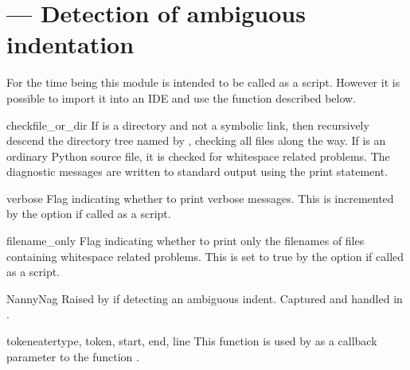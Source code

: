 \section{ ---
         Detection of ambiguous indentation}



For the time being this module is intended to be called as a script.
However it is possible to import it into an IDE and use the function
 described below.


\begin{funcdesc}{check}{file_or_dir}
  If  is a directory and not a symbolic link, then
  recursively descend the directory tree named by ,
  checking all  files along the way.  If 
  is an ordinary Python source file, it is checked for whitespace
  related problems.  The diagnostic messages are written to standard
  output using the print statement.
\end{funcdesc}


\begin{datadesc}{verbose}
  Flag indicating whether to print verbose messages.
  This is incremented by the  option if called as a script.
\end{datadesc}


\begin{datadesc}{filename_only}
  Flag indicating whether to print only the filenames of files
  containing whitespace related problems.  This is set to true by the
   option if called as a script.
\end{datadesc}


\begin{excdesc}{NannyNag}
  Raised by  if detecting an ambiguous indent.
  Captured and handled in .
\end{excdesc}


\begin{funcdesc}{tokeneater}{type, token, start, end, line}
  This function is used by  as a callback parameter to
  the function .
\end{funcdesc}


\begin{seealso}
\end{seealso}
